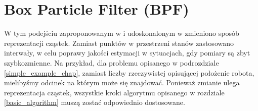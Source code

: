 \section{Box Particle Filter (BPF)} \label{bpf_chapter}
W tym podejściu zaproponowanym w \cite{bpf_base} i udoskonalonym w \cite{brbpf} zmieniono sposób reprezentacji cząstek. Zamiast punktów w przestrzeni stanów zastosowano interwały, w celu poprawy jakości estymacji w sytuacjach, gdy pomiary są zbyt szybkozmienne. Na przykład, dla problemu opisanego w podrozdziale \ref{simple_example_chap}, zamiast liczby rzeczywistej opisującej położenie robota, mielibyśmy odcinek na którym może się znajdować. Ponieważ zmianie ulega reprezentacja cząstek, wszystkie kroki algorytmu opisanego w rozdziale \ref{basic_algorithm} muszą zostać odpowiednio dostosowane.
